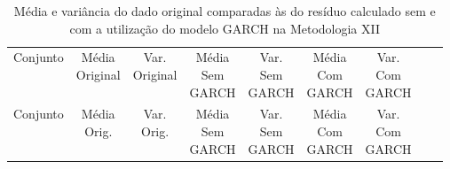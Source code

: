 \clearpage

\begin{center}
\begin{longtable}{ccccccccc}
\toprule
\rowcolor{white}
\caption[Metodologia XII: dados estatísticos]{Média e variância do dado original
comparadas às do resíduo calculado sem e com a utilização do modelo GARCH na
Metodologia XII} \label{tab:DadosEstatisticosMet12}\\
\midrule
    Conjunto & \specialcell{Média\\Original} &
    \specialcell{Var.\\Original} & \specialcell{Média\\Sem\\GARCH} &
    \specialcell{Var.\\Sem\\GARCH} & \specialcell{Média\\Com\\GARCH}&
    \specialcell{Var.\\Com\\GARCH} \\

\midrule
\endfirsthead 
\midrule
\rowcolor{white}
    Conjunto & \specialcell{Média\\Orig.} &
    \specialcell{Var.\\Orig.} & \specialcell{Média\\Sem\\GARCH} &
    \specialcell{Var.\\Sem\\GARCH} & \specialcell{Média\\Com\\GARCH}&
    \specialcell{Var.\\Com\\GARCH} \\


\end{longtable}
\end{center}
